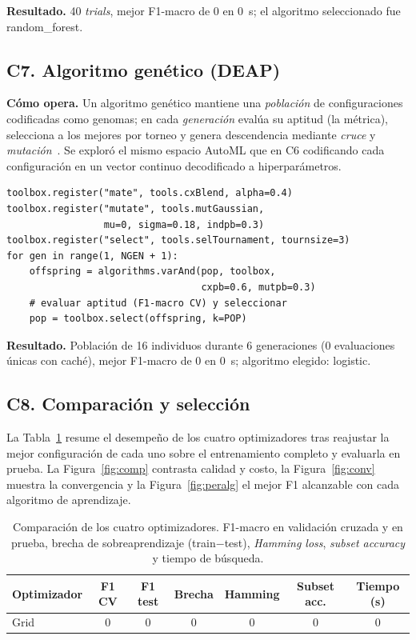 \documentclass[11pt,a4paper,twocolumn]{article}
\providecommand{\OptunaCV}{0}\providecommand{\OptunaTime}{0}\providecommand{\OptunaTrials}{40}
\providecommand{\GenCV}{0}\providecommand{\GenTime}{0}\providecommand{\GenEvals}{0}\providecommand{\GenPop}{16}\providecommand{\GenGen}{6}
\providecommand{\OptunaAlgo}{random\_forest}\providecommand{\GenAlgo}{logistic}\providecommand{\TotalRuntime}{0}
\providecommand{\TablaOptim}{Grid & 0 & 0 & 0 & 0 & 0 & 0 \\}
\begin{document}
\noindent\textbf{Resultado.} \OptunaTrials{} \textit{trials}, mejor F1-macro de \OptunaCV{} en
\OptunaTime{}~s; el algoritmo seleccionado fue \OptunaAlgo{}.

\subsection{C7. Algoritmo genético (DEAP)}
\textbf{Cómo opera.} Un algoritmo genético mantiene una \emph{población} de configuraciones codificadas como
genomas; en cada \emph{generación} evalúa su aptitud (la métrica), selecciona a los mejores por torneo y
genera descendencia mediante \emph{cruce} y \emph{mutación}~\cite{goldberg1989}. Se exploró el mismo espacio
AutoML que en C6 codificando cada configuración en un vector continuo decodificado a hiperparámetros.

\begin{lstlisting}[caption={C7 -- Bucle evolutivo con DEAP}]
toolbox.register("mate", tools.cxBlend, alpha=0.4)
toolbox.register("mutate", tools.mutGaussian,
                 mu=0, sigma=0.18, indpb=0.3)
toolbox.register("select", tools.selTournament, tournsize=3)
for gen in range(1, NGEN + 1):
    offspring = algorithms.varAnd(pop, toolbox,
                                  cxpb=0.6, mutpb=0.3)
    # evaluar aptitud (F1-macro CV) y seleccionar
    pop = toolbox.select(offspring, k=POP)
\end{lstlisting}

\noindent\textbf{Resultado.} Población de \GenPop{} individuos durante \GenGen{} generaciones (\GenEvals{}
evaluaciones únicas con caché), mejor F1-macro de \GenCV{} en \GenTime{}~s; algoritmo elegido: \GenAlgo{}.

\subsection{C8. Comparación y selección}
La Tabla~\ref{tab:optim} resume el desempeño de los cuatro optimizadores tras reajustar la mejor
configuración de cada uno sobre el entrenamiento completo y evaluarla en prueba. La
Figura~\ref{fig:comp} contrasta calidad y costo, la Figura~\ref{fig:conv} muestra la convergencia y la
Figura~\ref{fig:peralg} el mejor F1 alcanzable con cada algoritmo de aprendizaje.

\begin{table}[!t]
\centering
\caption{Comparación de los cuatro optimizadores. F1-macro en validación cruzada y en prueba, brecha de
sobreaprendizaje (train$-$test), \textit{Hamming loss}, \textit{subset accuracy} y tiempo de búsqueda.}
\label{tab:optim}
\small
\begin{tabular}{lcccccc}
\toprule
\textbf{Optimizador} & \textbf{F1 CV} & \textbf{F1 test} & \textbf{Brecha} & \textbf{Hamming} & \textbf{Subset acc.} & \textbf{Tiempo (s)} \\
\midrule
\TablaOptim
\bottomrule
\end{tabular}
\end{table}
\end{document}
